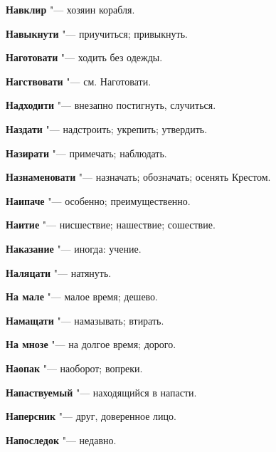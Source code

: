 \begin{mymulticols}{2}
\noindent\textbf{Навклир} "--- хозяин корабля. 




\noindent\textbf{Навыкнути} "--- приучиться; привыкнуть. 




\noindent\textbf{Наготовати} "--- ходить без одежды. 




\noindent\textbf{Нагствовати} "--- см. Наготовати. 




\noindent\textbf{Надходити} "--- внезапно постигнуть, случиться. 




\noindent\textbf{Наздати} "--- надстроить; укрепить; утвердить. 




\noindent\textbf{Назирати} "--- примечать; наблюдать. 




\noindent\textbf{Назнаменовати} "--- назначать; обозначать; осенять Крестом. 




\noindent\textbf{Наипаче} "--- особенно; преимущественно. 




\noindent\textbf{Наитие} "--- нисшествие; нашествие; сошествие. 




\noindent\textbf{Наказание} "--- иногда: учение. 




\noindent\textbf{Наляцати} "--- натянуть. 




\noindent\textbf{На мале} "--- малое время; дешево. 




\noindent\textbf{Намащати} "--- намазывать; втирать. 




\noindent\textbf{На мнозе} "--- на долгое время; дорого. 




\noindent\textbf{Наопак} "--- наоборот; вопреки. 




\noindent\textbf{Напаствуемый} "--- находящийся в напасти. 




\noindent\textbf{Наперсник} "--- друг, доверенное лицо. 




\noindent\textbf{Напоследок} "--- недавно. 





\end{mymulticols}
